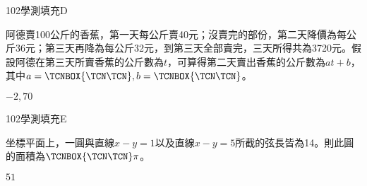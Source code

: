     \begin{QUESTION}
        \begin{ExamInfo}{102}{學測}{填充}{D}
        \end{ExamInfo}
        \begin{ExamAnsRateInfo}{23}{53}{15}{1}
        \end{ExamAnsRateInfo}
        \begin{QBODY}
            阿德賣100公斤的香蕉，第一天每公斤賣40元；沒賣完的部份，第二天降價為每公斤36元；第三天再降為每公斤32元，到第三天全部賣完，三天所得共為3720元。假設阿德在第三天所賣香蕉的公斤數為$t$，可算得第二天賣出香蕉的公斤數為$at+b$，其中$a= \TCNBOX{\TCN\TCN}, b= \TCNBOX{\TCN\TCN}$。
        \end{QBODY}
        \begin{QFROMS}
        \end{QFROMS}
        \begin{QTAGS}\end{QTAGS}
        \begin{QANS}
            $-2,70$
        \end{QANS}
        \begin{QSOLLIST}
        \end{QSOLLIST}
        \begin{QEMPTYSPACE}
        \end{QEMPTYSPACE}
    \end{QUESTION}
    \begin{QUESTION}
        \begin{ExamInfo}{102}{學測}{填充}{E}
        \end{ExamInfo}
        \begin{ExamAnsRateInfo}{29}{67}{19}{1}
        \end{ExamAnsRateInfo}
        \begin{QBODY}
            坐標平面上，一圓與直線$x-y=1$以及直線$x-y=5$所截的弦長皆為14。則此圓的面積為$\TCNBOX{\TCN\TCN} \pi $。
        \end{QBODY}
        \begin{QFROMS}
        \end{QFROMS}
        \begin{QTAGS}\end{QTAGS}
        \begin{QANS}
            $51$
        \end{QANS}
        \begin{QSOLLIST}
        \end{QSOLLIST}
        \begin{QEMPTYSPACE}
        \end{QEMPTYSPACE}
    \end{QUESTION}

